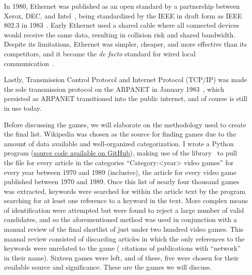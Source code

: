 In 1980, Ethernet was published as an open standard by a partnership between Xerox, DEC, and Intel~\cite{DIX}, being standardized by the IEEE in draft form as IEEE 802.3 in 1983~\cite{IEEE8023}. Early Ethernet used a shared cable where all connected devices would receive the same data, resulting in collision risk and shared bandwidth. Despite its limitations, Ethernet was simpler, cheaper, and more effective than its competitors, and it became the \textit{de facto} standard for wired local communication~\cite{metcalfe}.

Lastly, Transmission Control Protocol and Internet Protocol (TCP/IP) was made the sole transmission protocol on the ARPANET in January 1983~\cite{flagday}, which persisted as ARPANET transitioned into the public internet, and of course is still in use today.

Before discussing the games, we will elaborate on the methodology used to create the final list. Wikipedia was chosen as the source for finding games due to the amount of data available and well-organized categorization. I wrote a Python program (\href{https://github.com/Anidion/wikipedia-scraper}{source code available on GitHub}), making use of the  library~\cite{pywikibot} to pull the  file for every article in the categories ``Category:<year> video games'' for every year between 1970 and 1989 (inclusive), \ie{} the article for every video game published between 1970 and 1989. Once this list of nearly four thousand games was extracted, keywords were searched for within the article text by the program searching for at least one reference to a keyword in the text. More complex means of identification were attempted but were found to reject a large number of valid candidates, and so the aforementioned method was used in conjunction with a manual review of the final shortlist of just under two hundred video games. This manual review consisted of discarding articles in which the only references to the keywords were unrelated to the game (\eg{} citations of publications with ``network'' in their name). Sixteen games were left, and of these, five were chosen for their available source and significance. These are the games we will discuss.
